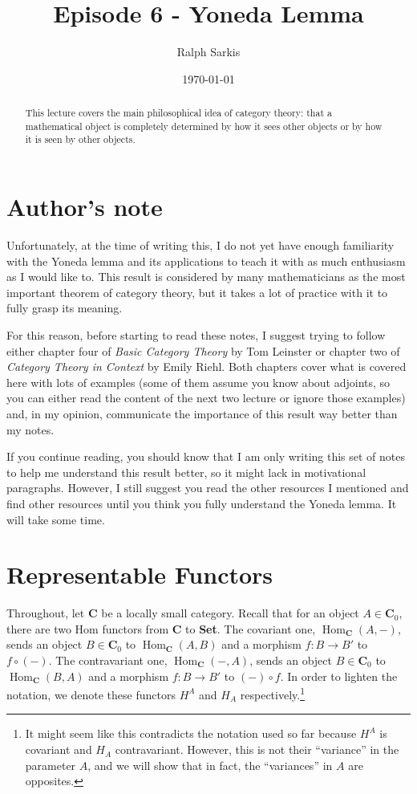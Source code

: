 \documentclass{article}
\title{Episode 6 - Yoneda Lemma\vspace{-10pt}}
\author{Ralph Sarkis}
\date{\vspace{-10pt}\today\vspace{-15pt}}  %
\theoremstyle{definition}
\theoremstyle{remark}
\DeclareMathOperator{\Hom}{Hom}
\begin{document}
\maketitle
\begin{abstract} This lecture covers the main philosophical idea of category theory: that a mathematical object is completely determined by how it sees other objects or by how it is seen by other objects.
\end{abstract}
\setcounter{section}{-1}
\section{Author's note}
Unfortunately, at the time of writing this, I do not yet have enough familiarity with the Yoneda lemma and its applications to teach it with as much enthusiasm as I would like to. This result is considered by many mathematicians as the most important theorem of category theory, but it takes a lot of practice with it to fully grasp its meaning.

For this reason, before starting to read these notes, I suggest trying to follow either chapter four of \textit{Basic Category Theory} by Tom Leinster or chapter two of \textit{Category Theory in Context} by Emily Riehl. Both chapters cover what is covered here with lots of examples (some of them assume you know about adjoints, so you can either read the content of the next two lecture or ignore those examples) and, in my opinion, communicate the importance of this result way better than my notes.

If you continue reading, you should know that I am only writing this set of notes to help me understand this result better, so it might lack in motivational paragraphs. However, I still suggest you read the other resources I mentioned and find other resources until you think you fully understand the Yoneda lemma. It will take some time.
\section{Representable Functors}
Throughout, let $\mathbf{C}$ be a locally small category. Recall that for an object $A \in \mathbf{C}_0$, there are two Hom functors from $\mathbf{C}$ to \textbf{Set}. The covariant one, $\Hom_{\mathbf{C}}(A, -)$, sends an object $B \in \mathbf{C}_0$ to $\Hom_{\mathbf{C}}(A,B)$ and a morphism $f:B\rightarrow B'$ to $f \circ (-)$. The contravariant one, $\Hom_{\mathbf{C}}(-,A)$, sends an object $B \in \mathbf{C}_0$ to $\Hom_{\mathbf{C}}(B,A)$ and a morphism $f: B\rightarrow B'$ to $(-) \circ f$. In order to lighten the notation, we denote these functors $H^A$ and $H_A$ respectively.\footnote{It might seem like this contradicts the notation used so far because $H^A$ is covariant and $H_A$ contravariant. However, this is not their ``variance'' in the parameter $A$, and we will show that in fact, the ``variances'' in $A$ are opposites.}
\end{document}
